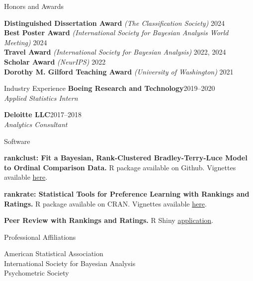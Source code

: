 \documentclass{resume} %
\begin{document}
\begin{rSection}{Honors and Awards}

\textbf{Distinguished Dissertation Award} {\it (The Classification Society)} \hfill {2024}
\\ \textbf{Best Poster Award} {\it (International Society for Bayesian Analysis World Meeting)} \hfill {2024}
\\ \textbf{Travel Award} {\it (International Society for Bayesian Analysis)} \hfill {2022, 2024}
\\ \textbf{Scholar Award} {\it (NeurIPS)} \hfill {2022}
\\ \textbf{Dorothy M. Gilford Teaching Award} {\it (University of Washington)} \hfill {2021}

\end{rSection}

\newpage
\begin{rSection}{Industry Experience}
\textbf{Boeing Research and Technology}\hfill{2019--2020}
\\{\it Applied Statistics Intern}

\textbf{Deloitte LLC}\hfill{2017--2018}
\\{\it Analytics Consultant}

\end{rSection}

\begin{rSection}{Software}

\textbf{rankclust: Fit a Bayesian, Rank-Clustered Bradley-Terry-Luce Model to Ordinal Comparison Data.} R package available on Github. Vignettes available \href{https://pearce790.github.io/rankclust/}{here}.

\textbf{rankrate: Statistical Tools for Preference Learning with Rankings and Ratings.} R package available on CRAN. Vignettes available \href{https://pearce790.github.io/rankrate/}{here}.

\textbf{Peer Review with Rankings and Ratings.} R Shiny \href{https://pearce790.shinyapps.io/rankrate_PeerReview/}{application}.

\end{rSection}

\begin{rSection}{Professional Affiliations}

American Statistical Association
\\ International Society for Bayesian Analysis
\\ Psychometric Society

\end{rSection}
\end{document}

